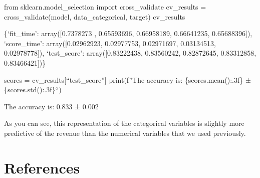 \documentclass[
  letterpaper,
  DIV=11,
  numbers=noendperiod,
  oneside]{scrreprt}
\begin{document}
from sklearn.model\_selection import cross\_validate cv\_results =
cross\_validate(model, data\_categorical, target) cv\_results

\{`fit\_time': array({[}0.7378273 , 0.65593696, 0.66958189, 0.66641235,
0.65688396{]}), `score\_time': array({[}0.02962923, 0.02977753,
0.02971697, 0.03134513, 0.02978778{]}), `test\_score':
array({[}0.83222438, 0.83560242, 0.82872645, 0.83312858,
0.83466421{]})\}

scores = cv\_results{[}``test\_score''{]} print(f''The accuracy is:
\{scores.mean():.3f\} ± \{scores.std():.3f\}``)

The accuracy is: 0.833 ± 0.002

As you can see, this representation of the categorical variables is
slightly more predictive of the revenue than the numerical variables
that we used previously.


\hypertarget{references-2}{%
\chapter*{References}\label{references-2}}
\end{document}

